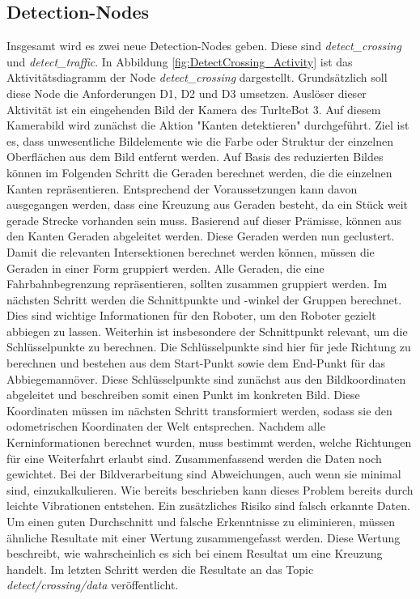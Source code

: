 \subsection{Detection-Nodes}
Insgesamt wird es zwei neue Detection-Nodes geben. Diese sind \textit{detect\_crossing} und \textit{detect\_traffic}. In Abbildung \ref{fig:DetectCrossing_Activity} ist das Aktivitätsdiagramm
der Node \textit{detect\_crossing} dargestellt. Grundsätzlich soll diese Node die Anforderungen D1, D2 und D3 umsetzen. Auslöser dieser Aktivität ist 
ein eingehenden Bild der Kamera des TurlteBot 3. Auf diesem Kamerabild wird zunächst die Aktion "Kanten detektieren"
durchgeführt. Ziel ist es, dass unwesentliche Bildelemente wie die Farbe oder Struktur der einzelnen Oberflächen aus dem Bild entfernt werden. Auf Basis des reduzierten Bildes können
im Folgenden Schritt die Geraden berechnet werden, die die einzelnen Kanten repräsentieren. Entsprechend der Voraussetzungen kann davon ausgegangen werden, dass eine Kreuzung
aus Geraden besteht, da ein Stück weit gerade Strecke vorhanden sein muss. Basierend auf dieser Prämisse, können aus den Kanten Geraden abgeleitet werden.
Diese Geraden werden nun geclustert. Damit die relevanten Intersektionen berechnet werden können, müssen die Geraden in einer Form gruppiert werden. Alle Geraden, die eine Fahrbahnbegrenzung
repräsentieren, sollten zusammen gruppiert werden. Im nächsten Schritt werden die Schnittpunkte und -winkel der Gruppen berechnet. Dies sind wichtige Informationen für den Roboter, 
um den Roboter gezielt abbiegen zu lassen. Weiterhin ist insbesondere der Schnittpunkt relevant, um die Schlüsselpunkte zu berechnen. Die Schlüsselpunkte sind hier für jede Richtung zu berechnen
und bestehen aus dem Start-Punkt sowie dem End-Punkt für das Abbiegemannöver. Diese Schlüsselpunkte sind zunächst aus den Bildkoordinaten abgeleitet und beschreiben somit einen Punkt
im konkreten Bild. Diese Koordinaten müssen im nächsten Schritt transformiert werden, sodass sie den odometrischen Koordinaten der Welt entsprechen. Nachdem alle Kerninformationen
berechnet wurden, muss bestimmt werden, welche Richtungen für eine Weiterfahrt erlaubt sind. Zusammenfassend werden die Daten noch gewichtet. Bei der Bildverarbeitung sind Abweichungen, auch
wenn sie minimal sind, einzukalkulieren. Wie bereits beschrieben kann dieses Problem bereits durch leichte Vibrationen entstehen. Ein zusätzliches Risiko sind falsch erkannte Daten.
Um einen guten Durchschnitt und falsche Erkenntnisse zu eliminieren, müssen ähnliche Resultate mit einer Wertung zusammengefasst werden. Diese Wertung beschreibt, wie wahrscheinlich 
es sich bei einem Resultat um eine Kreuzung handelt.
Im letzten Schritt werden die Resultate an das Topic \textit{detect/crossing/data} veröffentlicht.

